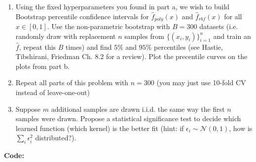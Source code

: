 \documentclass{article}
\newcommand{\1}{\mathbf{1}}
\begin{document}
\begin{enumerate}
  \item Using the fixed hyperparameters you found in part a, we wish to build Bootstrap percentile confidence intervals for $\widehat{f}_{poly}(x)$ and $\widehat{f}_{rbf}(x)$ for all $x \in [0,1]$.
  Use the non-parametric bootstrap with $B=300$ datasets (i.e. randomly draw with replacement $n$ samples from $\{(x_i,y_i)\}_{i=1}^n$ and train an $\widehat{f}$, repeat this $B$ times) and find $5\%$ and $95\%$ percentiles (see Hastie, Tibshirani, Friedman Ch. 8.2 for a review). Plot the precentile curves on the plots from part b.
  \item Repeat all parts of this problem with $n=300$ (you may just use 10-fold CV instead of leave-one-out)

  \item Suppose $m$ additional samples are drawn i.i.d. the same way the first $n$ samples were drawn. Propose a statistical significance test to decide which learned function (which kernel) is the better fit (hint: if $\epsilon_i \sim \mathcal{N}(0,1)$, how is $\sum_i \epsilon_i^2$ distributed?).
\end{enumerate}
\textbf{Code:}
\end{document}
